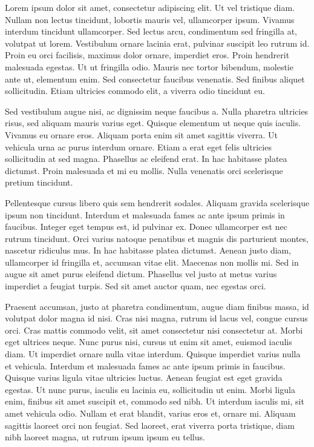 \documentclass{report}
\begin{document}
Lorem ipsum dolor sit amet, consectetur adipiscing elit. Ut vel tristique diam. Nullam non lectus tincidunt, lobortis mauris vel, ullamcorper ipsum. Vivamus interdum tincidunt ullamcorper. Sed lectus arcu, condimentum sed fringilla at, volutpat ut lorem. Vestibulum ornare lacinia erat, pulvinar suscipit leo rutrum id. Proin eu orci facilisis, maximus dolor ornare, imperdiet eros. Proin hendrerit malesuada egestas. Ut ut fringilla odio. Mauris nec tortor bibendum, molestie ante ut, elementum enim. Sed consectetur faucibus venenatis. Sed finibus aliquet sollicitudin. Etiam ultricies commodo elit, a viverra odio tincidunt eu.

Sed vestibulum augue nisi, ac dignissim neque faucibus a. Nulla pharetra ultricies risus, sed aliquam mauris varius eget. Quisque elementum ut neque quis iaculis. Vivamus eu ornare eros. Aliquam porta enim sit amet sagittis viverra. Ut vehicula urna ac purus interdum ornare. Etiam a erat eget felis ultricies sollicitudin at sed magna. Phasellus ac eleifend erat. In hac habitasse platea dictumst. Proin malesuada et mi eu mollis. Nulla venenatis orci scelerisque pretium tincidunt.

Pellentesque cursus libero quis sem hendrerit sodales. Aliquam gravida scelerisque ipsum non tincidunt. Interdum et malesuada fames ac ante ipsum primis in faucibus. Integer eget tempus est, id pulvinar ex. Donec ullamcorper est nec rutrum tincidunt. Orci varius natoque penatibus et magnis dis parturient montes, nascetur ridiculus mus. In hac habitasse platea dictumst. Aenean justo diam, ullamcorper id fringilla et, accumsan vitae elit. Maecenas non mollis mi. Sed in augue sit amet purus eleifend dictum. Phasellus vel justo at metus varius imperdiet a feugiat turpis. Sed sit amet auctor quam, nec egestas orci.

Praesent accumsan, justo at pharetra condimentum, augue diam finibus massa, id volutpat dolor magna id nisi. Cras nisi magna, rutrum id lacus vel, congue cursus orci. Cras mattis commodo velit, sit amet consectetur nisi consectetur at. Morbi eget ultrices neque. Nunc purus nisi, cursus ut enim sit amet, euismod iaculis diam. Ut imperdiet ornare nulla vitae interdum. Quisque imperdiet varius nulla et vehicula. Interdum et malesuada fames ac ante ipsum primis in faucibus. Quisque varius ligula vitae ultricies luctus. Aenean feugiat est eget gravida egestas. Ut nunc purus, iaculis eu lacinia eu, sollicitudin ut enim. Morbi ligula enim, finibus sit amet suscipit et, commodo sed nibh. Ut interdum iaculis mi, sit amet vehicula odio. Nullam et erat blandit, varius eros et, ornare mi. Aliquam sagittis laoreet orci non feugiat. Sed laoreet, erat viverra porta tristique, diam nibh laoreet magna, ut rutrum ipsum ipsum eu tellus.
\end{document}
